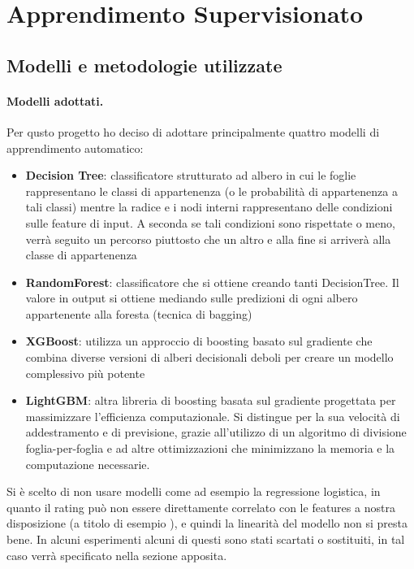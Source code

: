 \section{Apprendimento Supervisionato}

\subsection{Modelli e metodologie utilizzate}

\paragraph{Modelli adottati.} Per qusto progetto ho deciso di adottare principalmente quattro modelli di apprendimento automatico:
\begin{itemize}[label=-]
    \item \textbf{Decision Tree}: classificatore strutturato ad albero in cui le foglie
    rappresentano le classi di appartenenza (o le probabilità di appartenenza a tali
    classi) mentre la radice e i nodi interni rappresentano delle condizioni sulle
    feature di input. A seconda se tali condizioni sono rispettate o meno, verrà
    seguito un percorso piuttosto che un altro e alla fine si arriverà alla classe di
    appartenenza
    \item \textbf{RandomForest}: classificatore che si ottiene creando tanti DecisionTree. Il valore in output si ottiene mediando sulle predizioni di ogni albero
    appartenente alla foresta (tecnica di bagging)
    \item \textbf{XGBoost}: utilizza un approccio di boosting basato sul gradiente che combina diverse versioni di alberi decisionali deboli per creare un modello complessivo più potente
    \item \textbf{LightGBM}: altra libreria di boosting basata sul gradiente progettata per massimizzare l'efficienza computazionale. Si distingue per la sua velocità di addestramento e di previsione, grazie all'utilizzo di un algoritmo di divisione foglia-per-foglia e ad altre ottimizzazioni che minimizzano la memoria e la computazione necessarie.
\end{itemize}
\noindent Si è scelto di non usare modelli come ad esempio la regressione logistica, in quanto il rating può non essere direttamente correlato con le features a nostra disposizione (a titolo di esempio \cite{ilfattoquotidiano}), e quindi la linearità del modello non si presta bene. In alcuni esperimenti alcuni di questi sono stati scartati o sostituiti, in tal caso verrà specificato nella sezione apposita.
